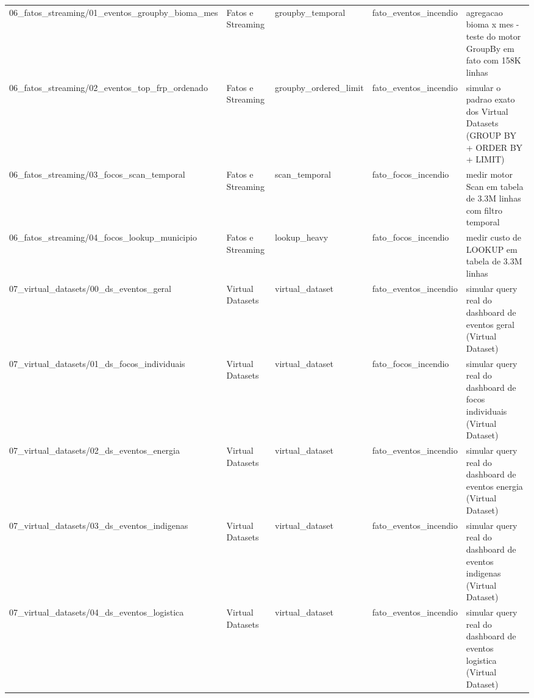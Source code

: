 \begin{landscape}
{\begin{longtable}{p{}p{}p{}p{}p{}}
06\_fatos\_streaming/01\_eventos\_groupby\_bioma\_mes & Fatos e Streaming & groupby\_temporal & fato\_eventos\_incendio & agregacao bioma x mes - teste do motor GroupBy em fato com 158K linhas \\
06\_fatos\_streaming/02\_eventos\_top\_frp\_ordenado & Fatos e Streaming & groupby\_ordered\_limit & fato\_eventos\_incendio & simular o padrao exato dos Virtual Datasets (GROUP BY + ORDER BY + LIMIT) \\
06\_fatos\_streaming/03\_focos\_scan\_temporal & Fatos e Streaming & scan\_temporal & fato\_focos\_incendio & medir motor Scan em tabela de 3.3M linhas com filtro temporal \\
06\_fatos\_streaming/04\_focos\_lookup\_municipio & Fatos e Streaming & lookup\_heavy & fato\_focos\_incendio & medir custo de LOOKUP em tabela de 3.3M linhas \\
07\_virtual\_datasets/00\_ds\_eventos\_geral & Virtual Datasets & virtual\_dataset & fato\_eventos\_incendio & simular query real do dashboard de eventos geral (Virtual Dataset) \\
07\_virtual\_datasets/01\_ds\_focos\_individuais & Virtual Datasets & virtual\_dataset & fato\_focos\_incendio & simular query real do dashboard de focos individuais (Virtual Dataset) \\
07\_virtual\_datasets/02\_ds\_eventos\_energia & Virtual Datasets & virtual\_dataset & fato\_eventos\_incendio & simular query real do dashboard de eventos energia (Virtual Dataset) \\
07\_virtual\_datasets/03\_ds\_eventos\_indigenas & Virtual Datasets & virtual\_dataset & fato\_eventos\_incendio & simular query real do dashboard de eventos indigenas (Virtual Dataset) \\
07\_virtual\_datasets/04\_ds\_eventos\_logistica & Virtual Datasets & virtual\_dataset & fato\_eventos\_incendio & simular query real do dashboard de eventos logistica (Virtual Dataset) \\
\bottomrule
\end{longtable}
}
\end{landscape}
